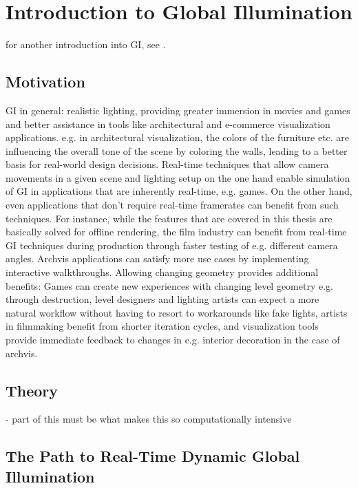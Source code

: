 \section{Introduction to Global Illumination}

for another introduction into GI, see \citet{Ritschel:2012:GISTAR}.

\subsection{Motivation}
\begin{outline}
\1 GI in general: realistic lighting, providing greater immersion in movies and games and better assistance in tools like architectural and e-commerce visualization applications. e.g. in architectural visualization, the colors of the furniture etc. are influencing the overall tone of the scene by coloring the walls, leading to a better basis for real-world design decisions.
\1 Real-time techniques that allow camera movements in a given scene and lighting setup on the one hand enable simulation of GI in applications that are inherently real-time, e.g. games.
\1 On the other hand, even applications that don't require real-time framerates can benefit from such techniques. For instance, while the features that are covered in this thesis are basically solved for offline rendering, the film industry can benefit from real-time GI techniques during production through faster testing of e.g. different camera angles. Archvis applications can satisfy more use cases by implementing interactive walkthroughs.
\1 Allowing changing geometry provides additional benefits: Games can create new experiences with changing level geometry e.g. through destruction, level designers and lighting artists can expect a more natural workflow without having to resort to workarounds like fake lights, artists in filmmaking benefit from shorter iteration cycles, and visualization tools provide immediate feedback to changes in e.g. interior decoration in the case of archvis.
\end{outline}


\subsection{Theory}

- part of this must be what makes this so computationally intensive


\subsection{The Path to Real-Time Dynamic Global Illumination}


